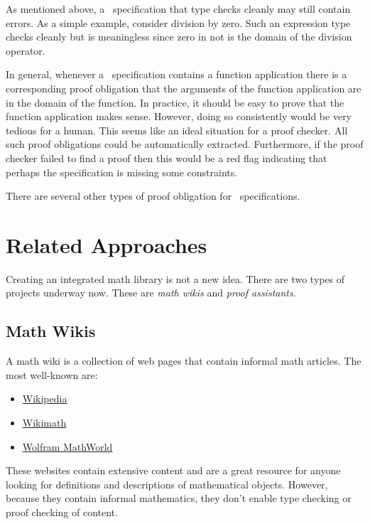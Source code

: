 \documentclass{amsart}
\begin{document}
 As mentioned above, a \ZN\ specification that type checks cleanly may still contain errors.
 As a simple example, consider division by zero. 
 Such an expression type checks cleanly but is meaningless since zero in not is the domain of the division operator.
 
 In general, whenever a \ZN\ specification contains a function application there is a corresponding proof obligation
 that the arguments of the function application are in the domain of the function.
 In practice, it should be easy to prove that the function application makes sense.
 However, doing so consistently would be very tedious for a human.
 This seems like an ideal situation for a proof checker.
 All such proof obligations could be automatically extracted.
 Furthermore, if the proof checker failed to find a proof then this would be a red flag indicating that perhaps the specification
 is missing some constraints.
 
 There are several other types of proof obligation for \ZN\ specifications.
 
\hypertarget{related-approaches}{}
\section{Related Approaches}

Creating an integrated math library is not a new idea. 
There are two types of projects underway now.
These are \textit{math wikis} and \textit{proof assistants}.

\subsection{Math Wikis}

A math wiki is a collection of web pages that contain informal math articles.
The most well-known are:
\begin{itemize}
\item \href{https://en.wikipedia.org/wiki/Main_Page}{Wikipedia}
\item \href{https://meta.wikimedia.org/wiki/Wikimath}{Wikimath}
\item \href{https://mathworld.wolfram.com}{Wolfram MathWorld}
\end{itemize}

These websites contain extensive content and are a great resource for anyone looking for definitions and descriptions of
mathematical objects.
However, because they contain informal mathematics, they don't enable type checking or proof checking of content.
\end{document}
